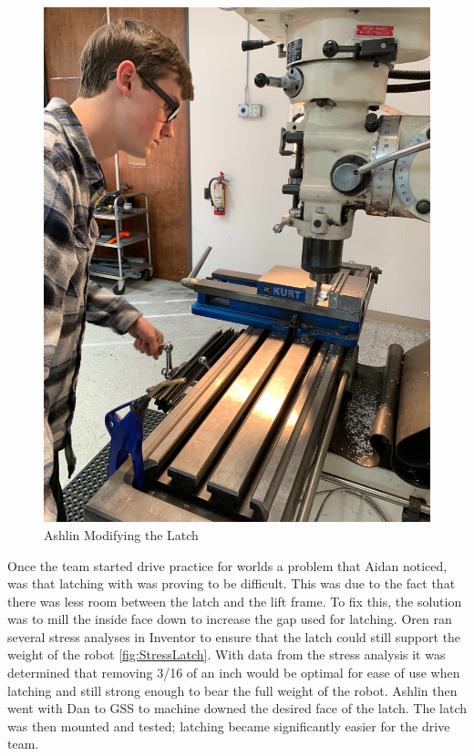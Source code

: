\documentclass{article}
\begin{document}
\begin{figure}
    \centering
    \includegraphics[width= 0.5 \textwidth]{32_04-08/images/ashlinmachining.jpg}
    \caption{Ashlin Modifying the Latch}
    \label{fig:latch}
\end{figure}
Once the team started drive practice for worlds a problem that Aidan noticed, was that latching with was proving to be difficult. This was due to the fact that there was less room between the latch and the lift frame. To fix this, the solution was to mill the inside face down to increase the gap used for latching. Oren ran several stress analyses in Inventor to ensure that the latch could still support the weight of the robot \ref{fig:StressLatch}. With data from the stress analysis it was determined that removing 3/16 of an inch would be optimal for ease of use when latching and still strong enough to bear the full weight of the robot. Ashlin then went with Dan to GSS to machine downed the desired face of the latch. The latch was then mounted and tested; latching became significantly easier for the drive team.  
\end{document}
